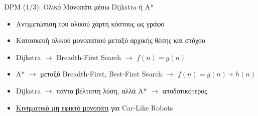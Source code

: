 \documentclass[10pt, compress]{beamer}
\begin{document}
\begin{frame}{DPM (1/3): Ολικό Μονοπάτι μέσω Dijkstra ή Α*}
	\begin{itemize}
		\item Αντιμετώπιση του ολικού χάρτη κόστους ως γράφο
		\item Κατασκευή ολικού μονοπατιού μεταξύ αρχικής θέσης και στόχου
		\item Dijkstra $\rightarrow$ Breadth-First Search $\rightarrow$ $f(n)=g(n)$
		\item Α* $\rightarrow$ μεταξύ Breadth-First, Best-First Search $\rightarrow$ $f(n)=g(n)+h(n)$
		\item Dijkstra $\rightarrow$ πάντα βέλτιστη λύση, αλλά Α* $\rightarrow$ αποδοτικότερος
		\item \underline{Κινηματικά μη εφικτό μονοπάτι} για Car-Like Robots
	\end{itemize}
	\vspace{-0.2cm}
	\begin{figure}
		\captionsetup[subfigure]{labelformat=empty}
		\hspace{1cm}
	\end{figure}
\end{frame}
\end{document}
